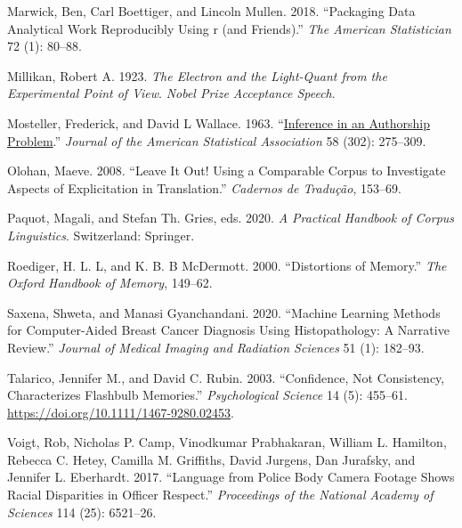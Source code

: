 \documentclass[
  letterpaper,
]{latex/krantz}
\newlength{\cslhangindent}
\newlength{\cslentryspacingunit} %
\newenvironment{CSLReferences}[2] %
 {%
  \setlength{\parindent}{0pt}
  \ifodd #1
  \let\oldpar\par
  \def\par{\hangindent=\cslhangindent\oldpar}
  \fi
  \setlength{\parskip}{#2\cslentryspacingunit}
 }%
 {}
\begin{document}
\begin{CSLReferences}{1}{0}
\leavevmode{}%
Marwick, Ben, Carl Boettiger, and Lincoln Mullen. 2018. {``Packaging
Data Analytical Work Reproducibly Using r (and Friends).''} \emph{The
American Statistician} 72 (1): 80--88.

\leavevmode{}%
Millikan, Robert A. 1923. \emph{The Electron and the Light-Quant from
the Experimental Point of View}. \emph{Nobel Prize Acceptance Speech}.

\leavevmode{}%
Mosteller, Frederick, and David L Wallace. 1963.
{``\href{https://www.ncbi.nlm.nih.gov/pubmed/3427}{Inference in an
Authorship Problem}.''} \emph{Journal of the American Statistical
Association} 58 (302): 275--309.

\leavevmode{}%
Olohan, Maeve. 2008. {``Leave It Out! Using a Comparable Corpus to
Investigate Aspects of Explicitation in Translation.''} \emph{Cadernos
de Tradução}, 153--69.

\leavevmode{}%
Paquot, Magali, and Stefan Th. Gries, eds. 2020. \emph{A Practical
Handbook of Corpus Linguistics}. Switzerland: Springer.

\leavevmode{}%
Roediger, H. L. L, and K. B. B McDermott. 2000. {``Distortions of
Memory.''} \emph{The Oxford Handbook of Memory}, 149--62.

\leavevmode{}%
Saxena, Shweta, and Manasi Gyanchandani. 2020. {``Machine Learning
Methods for Computer-Aided Breast Cancer Diagnosis Using Histopathology:
A Narrative Review.''} \emph{Journal of Medical Imaging and Radiation
Sciences} 51 (1): 182--93.

\leavevmode{}%
Talarico, Jennifer M., and David C. Rubin. 2003. {``Confidence, Not
Consistency, Characterizes Flashbulb Memories.''} \emph{Psychological
Science} 14 (5): 455--61. \url{https://doi.org/10.1111/1467-9280.02453}.

\leavevmode{}%
Voigt, Rob, Nicholas P. Camp, Vinodkumar Prabhakaran, William L.
Hamilton, Rebecca C. Hetey, Camilla M. Griffiths, David Jurgens, Dan
Jurafsky, and Jennifer L. Eberhardt. 2017. {``Language from Police Body
Camera Footage Shows Racial Disparities in Officer Respect.''}
\emph{Proceedings of the National Academy of Sciences} 114 (25):
6521--26.


\end{CSLReferences}
\end{document}

